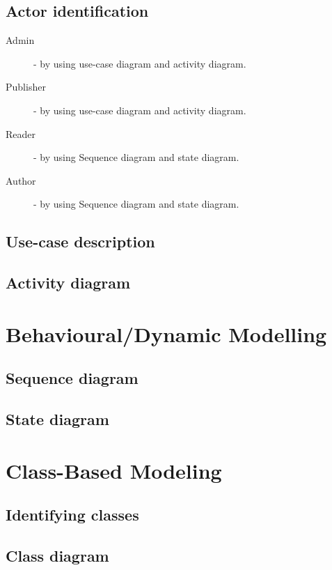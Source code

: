 	\subsection{Actor identification}

	\begin{description}
		\item[Admin] - by using use-case diagram and activity diagram.
		\item[Publisher] - by using use-case diagram and activity diagram.
		\item[Reader] - by using Sequence diagram and state diagram.
		\item[Author] - by using Sequence diagram and state diagram.
	\end{description}

	\subsection{Use-case description}

	

	\subsection{Activity diagram}



\section{Behavioural/Dynamic Modelling}
	\subsection{Sequence diagram}
	\subsection{State diagram}

\section{Class-Based Modeling}
	\subsection{Identifying classes}
	\subsection{Class diagram}
